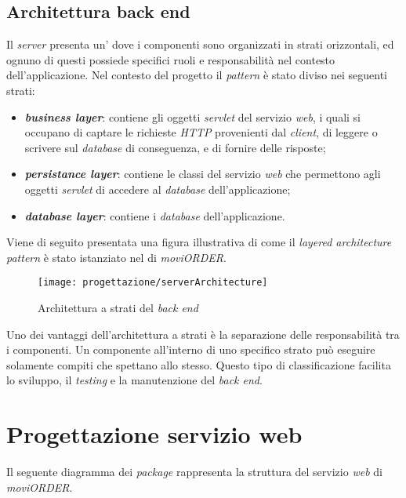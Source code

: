 \subsection{Architettura back end}

Il \textit{server} presenta un' dove i componenti sono organizzati in strati orizzontali, ed ognuno di questi possiede specifici ruoli e responsabilità nel contesto dell'applicazione. Nel contesto del progetto il \textit{pattern} è stato diviso nei seguenti strati:
\begin{itemize}
	\item \textbf{\textit{business layer}}: contiene gli oggetti \textit{servlet} del servizio \textit{web}, i quali si occupano di captare le richieste \textit{HTTP} provenienti dal \textit{client}, di leggere o scrivere sul \textit{database} di conseguenza, e di fornire delle risposte;
	\item \textbf{\textit{persistance layer}}: contiene le classi del servizio \textit{web} che permettono agli oggetti \textit{servlet} di accedere al \textit{database} dell'applicazione;
	\item \textbf{\textit{database layer}}: contiene i \textit{database} dell'applicazione.
\end{itemize}

\newpage

Viene di seguito presentata una figura illustrativa di come il \textit{layered architecture pattern} è stato istanziato nel  di \textit{moviORDER}. 

\begin{figure}[!h] 
    \centering 
    \texttt{[image: progettazione/serverArchitecture]} 
    \caption{Architettura a strati del \textit{back end}}
\end{figure}

Uno dei vantaggi dell'architettura a strati è la separazione delle responsabilità tra i componenti. Un componente all'interno di uno specifico strato può eseguire solamente compiti che spettano allo stesso. Questo tipo di classificazione facilita lo sviluppo, il \textit{testing} e la manutenzione del \textit{back end}.

\newpage

\section{Progettazione servizio web}

Il seguente diagramma dei \textit{package} rappresenta la struttura del servizio \textit{web} di \textit{moviORDER}.

